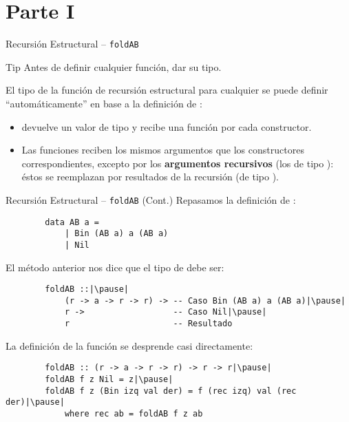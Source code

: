 \section{Parte I}

\begin{frame}{Recursión Estructural -- \texttt{foldAB}}
    \begin{block}{Tip}
        Antes de definir cualquier función, \alert{dar su tipo}.
    \end{block}

    \pause

    El tipo de la función de recursión estructural  para cualquier  se puede definir ``automáticamente'' en base a la definición de :
    
    \pause

    \begin{itemize}[<+->]
        \item {} devuelve un valor de tipo  y recibe una función  por cada constructor.
        \item Las funciones reciben los mismos argumentos que los constructores correspondientes, excepto por los \textbf{argumentos recursivos} (los de tipo ): éstos se reemplazan por resultados de la recursión (de tipo ).
    \end{itemize}
\end{frame}

\begin{frame}[fragile]{Recursión Estructural -- \texttt{foldAB} (Cont.)}
    Repasamos la definición de :

    \begin{verbatim}
        data AB a =
            | Bin (AB a) a (AB a)
            | Nil
    \end{verbatim}

    \pause

    El método anterior nos dice que el tipo de  debe ser:
    
    \begin{verbatim}
        foldAB ::|\pause|
            (r -> a -> r -> r) -> -- Caso Bin (AB a) a (AB a)|\pause|
            r ->                  -- Caso Nil|\pause|
            r                     -- Resultado
    \end{verbatim}

    \pause

    La definición de la función se desprende casi directamente:
    \begin{verbatim}
        foldAB :: (r -> a -> r -> r) -> r -> r|\pause|
        foldAB f z Nil = z|\pause|
        foldAB f z (Bin izq val der) = f (rec izq) val (rec der)|\pause|
            where rec ab = foldAB f z ab
        
    \end{verbatim}
\end{frame}
